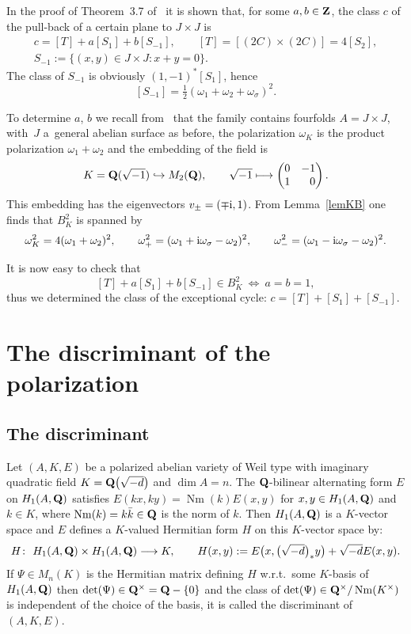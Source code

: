\documentclass[pdftex]{sigma}
\numberwithin{equation}{section}
\begin{document}
In the proof of Theorem~3.7 of~\cite{vG} it is shown that, for some $a,b\in{\bf Z}$,
the class $c$ of the pull-back of a certain plane to $J\times J$ is
\begin{gather*}
c = [T]+a[S_1]+b[S_{-1}],\qquad
[T] = [(2C)\times(2C)]=4[S_2],\\
S_{-1} := \{(x,y)\in J\times J\colon x+y=0\}.
\end{gather*}
The class of $S_{-1}$ is obviously $(1,-1)^*[S_1]$, hence
\[
[S_{-1}]=\tfrac{1}{2}(\omega_1+\omega_2+\omega_\sigma)^2.
\]

To determine $a$, $b$ we recall from~\cite{vG} that the family contains fourfolds
$A=J\times J$, with~$J$ a~general abelian surface as before, the polarization
$\omega_K$ is the product
polarization $\omega_1+\omega_2$ and
the embedding of the field is
\[
K = {\bf Q}(\sqrt{-1}) \hookrightarrow M_2({\bf Q}),\qquad
\sqrt{-1} \longmapsto \left(\begin{matrix}0&-1\\1&\hphantom{-}0\end{matrix}\right).
\]
This embedding has the eigenvectors $v_\pm=(\mp {\rm i},1)$.
From Lemma~\ref{lemKB} one finds that $B^2_K$ is spanned by
\[
\omega_K^2 = 4(\omega_1+\omega_2)^2,\qquad \omega_+^2 = (\omega_1+{\rm i}\omega_\sigma-\omega_2)^2,\qquad
\omega_-^2 = (\omega_1-{\rm i}\omega_\sigma-\omega_2)^2.
\]

It is now easy to check that
\[
[T]+a[S_1]+b[S_{-1}] \in B^2_K\ \Longleftrightarrow \ a = b =1,
\]
thus we determined the class of the exceptional cycle: $c=[T]+[S_1]+[S_{-1}]$.

\section{The discriminant of the polarization}\label{secdis}

\subsection{The discriminant}
Let $(A,K,E)$ be a polarized abelian variety of Weil type with imaginary quadratic field
$K={\bf Q}\big(\sqrt{-d}\big)$ and $\dim A=n$.
The ${\bf Q}$-bilinear alternating form $E$ on $H_1(A,{\bf Q})$ satisfies
$E(kx,ky)=\operatorname{Nm}(k)E(x,y)$ for $x,y\in H_1(A,{\bf Q})$ and $k\in K$,
where $\operatorname{Nm}(k)=k\bar{k}\in {\bf Q}$ is the norm of $k$.
Then $H_1(A,{\bf Q})$ is a $K$-vector space and
$E$ defines a $K$-valued Hermitian form $H$ on this $K$-vector space by:
\[
H \colon \ H_1(A,{\bf Q})\times H_1(A,{\bf Q}) \longrightarrow K,\qquad
H(x,y) := E\big(x,\big(\sqrt{-d}\big)_*y\big) + \sqrt{-d}E(x,y).
\]
If $\Psi\in M_n(K)$ is the Hermitian matrix defining $H$ w.r.t.\ some $K$-basis of $H_1(A,{\bf Q})$
then $\det(\Psi)\in {\bf Q}^\times={\bf Q}-\{0\}$ and the class
of $\det(\Psi)\in {\bf Q}^\times/\operatorname{Nm}(K^\times)$ is independent of the choice of the basis,
it is called the discriminant of $(A,K,E)$.
\end{document}
